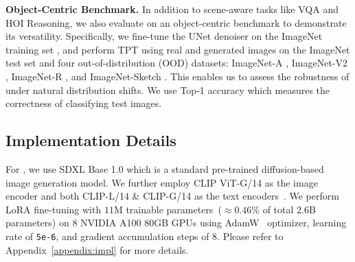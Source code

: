 \textbf{Object-Centric Benchmark.} In addition to scene-aware tasks like VQA and HOI Reasoning, we also evaluate \method on an object-centric benchmark to demonstrate its versatility. Specifically, we fine-tune the UNet denoiser on the ImageNet training set \citep{deng2009imagenet}, and perform TPT \citep{shu2022testtime} using real and generated images on the ImageNet test set and four out-of-distribution (OOD) datasets: ImageNet-A \citep{hendrycks2021natural}, ImageNet-V2 \citep{recht2019imagenet}, ImageNet-R \citep{hendrycks2021many}, and ImageNet-Sketch \citep{wang2019learning}. This enables us to assess the robustness of \method under natural distribution shifts. We use Top-1 accuracy which measures the correctness of classifying test images.

\vspace{-2mm}
\subsection{Implementation Details}
For \method, we use SDXL Base 1.0 which is a standard pre-trained diffusion-based image generation model. We further employ CLIP ViT-G/14 as the image encoder and both CLIP-L/14 \& CLIP-G/14 as the text encoders~\citep{radford2021learning}. We perform LoRA fine-tuning with $11$M trainable parameters~($\approx 0.46\%$ of total $2.6$B parameters) on $8$ NVIDIA A100 80GB GPUs using AdamW~\citep{loshchilov2017decoupled} optimizer, learning rate of \texttt{5e-6}, and gradient accumulation steps of $8$. Please refer to Appendix~\ref{appendix:impl} for more details.

\vspace{-2mm}
